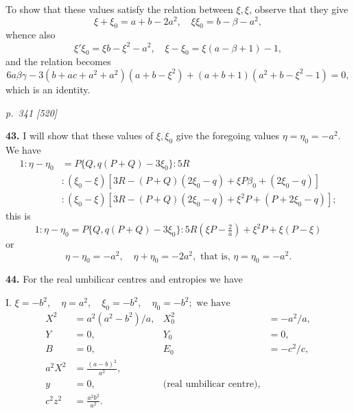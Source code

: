 \documentclass[11pt,a4paper]{article}
\theoremstyle{plain}
\theoremstyle{definition}
\begin{document}
To show that these values satisfy the relation between $\xi, \xi$, observe that they give
\[
\xi + \xi_0 = a + b - 2a^2,\quad \xi\xi_0 = b - \beta - a^2,
\]
whence also
\[
\xi'\xi_0 = \xi b - \xi^2 - a^2,\quad \xi - \xi_0 = \xi(a - \beta + 1) - 1,
\]
and the relation becomes
\[
6a\beta\gamma - 3(b + ac + a^2 + a^2)(a + b - \xi^2) + (a + b + 1)(a^2 + b - \xi^2 - 1) = 0,
\]
which is an identity.

\clearpage

\bigskip
\textit{p.~341 [520]}
\smallskip

\textbf{43.} I will show that these values of $\xi, \xi_0$ give the foregoing values $\eta = \eta_0 = -a^2$. We have
\begin{align*}
1 : \eta - \eta_0 &= P\{Q, q(P + Q) - 3\xi_0\} : 5R \\
&: (\xi_0 - \xi) [3R - (P + Q)(2\xi_0 - q) + \xi P\beta_0 + (2\xi_0 - q)] \\
&: (\xi_0 - \xi) [3R - (P + Q)(2\xi_0 - q) + \xi^2 P + (P + 2\xi_0 - q)];
\end{align*}
this is
\[
1 : \eta - \eta_0 = P\{Q, q(P + Q) - 3\xi_0\} : 5R\!\left(\xi P - \tfrac{2}{a}\right) + \xi^2 P + \xi(P - \xi)
\]
or
\[
\eta - \eta_0 = -a^2,\quad \eta + \eta_0 = -2a^2,\text{ that is, } \eta = \eta_0 = -a^2.
\]

\textbf{44.} For the real umbilicar centres and entropies we have

I. $\xi = -b^2,\quad \eta = a^2,\quad \xi_0 = -b^2,\quad \eta_0 = -b^2;\text{ we have}$
\begin{align*}
X^2 &= a^2(a^2 - b^2)/a, &
X_0^2 &= -a^2/a, \\
Y &= 0, & Y_0 &= 0,\\
B &= 0, & E_0 &= -c^2/c,\\
a^2 X^2 &= \tfrac{(a - b)^2}{a^2},\\
y &= 0, & \text{(real umbilicar centre)},\\
c^2 z^2 &= \tfrac{a^2 b^2}{a^2}.
\end{align*}
\end{document}
